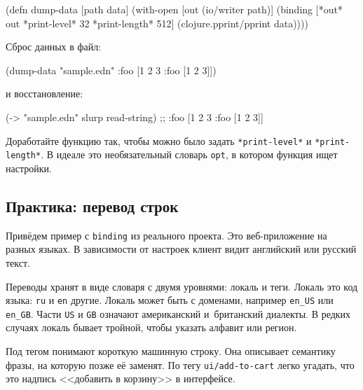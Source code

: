 \begin{english}
  \begin{clojure}
(defn dump-data
  [path data]
  (with-open [out (io/writer path)]
    (binding [*out* out
              *print-level* 32
              *print-length* 512]
      (clojure.pprint/pprint data))))
  \end{clojure}
\end{english}

\noindent
Сброс данных в файл:

\begin{english}
  \begin{clojure}
(dump-data "sample.edn" {:foo [1 2 3 {:foo [1 2 3]}]})
  \end{clojure}
\end{english}

\noindent
и восстановление:

\begin{english}
  \begin{clojure}
(-> "sample.edn" slurp read-string)
;; {:foo [1 2 3 {:foo [1 2 3]}]}
  \end{clojure}
\end{english}


Доработайте функцию так, чтобы можно было задать \verb|*print-level*| и
\verb|*print-length*|. В идеале это необязательный словарь \verb|opt|, в
котором функция ищет настройки.

\subsection{Практика: перевод строк}

\label{translate}

Привёдем пример с \verb|binding| из реального проекта. Это веб-приложение на
разных языках. В зависимости от настроек клиент видит английский или русский
текст.


Переводы хранят в виде словаря с двумя уровнями: локаль и теги. Локаль это код
языка: \verb|ru| и \verb|en| другие. Локаль может быть с доменами, например
\verb|en_US| или \verb|en_GB|. Части \verb|US| и \verb|GB| означают
американский и~британский диалекты. В редких случаях локаль бывает тройной,
чтобы указать алфавит или регион.

Под тегом понимают короткую машинную строку. Она описывает семантику фразы, на
которую позже её заменят. По тегу \verb|ui/add-to-cart| легко угадать, что
это надпись <<добавить в корзину>> в интерфейсе.

